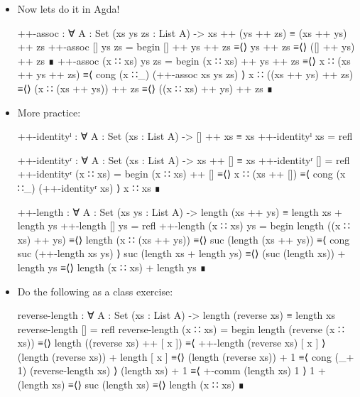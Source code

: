 \documentclass{lecturenotes}
\newcommand{\cons}{\ensuremath{\mathbin{\textsf{::}}}}
\newcommand{\app}{\ensuremath{\mathbin{\textsf{++}}}}
\begin{document}
\begin{itemize}
\begin{proof}
    \noindent\textbf{Base case ($xs = x \cons xs'$):}
    $$
    \begin{array}{l@{=\langle}c@{\rangle}}
      (x \cons xs') \app (ys \app zs) & \text{computation}\\
      x \cons (xs' \app (ys \app zs)) & \text{IH}\\
      x \cons ((xs' \app ys) \app zs) & \text{computation}\\
      (x \cons (xs' \app ys)) \app zs & \text{computation}\\
      \multicolumn{2}{l}{((x \cons xs') \app ys) \app zs}
    \end{array}
    $$
  \end{proof}
\pagebreak
\item Now lets do it in Agda!
\begin{code}
++-assoc : ∀ {A : Set} (xs ys zs : List A) -> xs ++ (ys ++ zs) ≡ (xs ++ ys) ++ zs
++-assoc [] ys zs =
  begin
    [] ++ ys ++ zs
  ≡⟨⟩
    ys ++ zs
  ≡⟨⟩
    ([] ++ ys) ++ zs
  ∎
++-assoc (x ∷ xs) ys zs =
  begin
    (x ∷ xs) ++ ys ++ zs
  ≡⟨⟩
    x ∷ (xs ++ ys ++ zs)
  ≡⟨ cong (x ∷_) (++-assoc xs ys zs) ⟩
    x ∷ ((xs ++ ys) ++ zs)
  ≡⟨⟩
    (x ∷ (xs ++ ys)) ++ zs
  ≡⟨⟩
    ((x ∷ xs) ++ ys) ++ zs
  ∎
\end{code}
\item More practice:
\begin{code}
++-identityˡ : ∀ {A : Set} (xs : List A) -> [] ++ xs ≡ xs
++-identityˡ xs = refl

++-identityʳ : ∀ {A : Set} (xs : List A) -> xs ++ [] ≡ xs
++-identityʳ [] = refl
++-identityʳ (x ∷ xs) =
  begin
     (x ∷ xs) ++ []
  ≡⟨⟩
    x ∷ (xs ++ [])
  ≡⟨ cong (x ∷_) (++-identityʳ xs) ⟩
    x ∷ xs
  ∎

++-length : ∀ {A : Set} (xs ys : List A) -> length (xs ++ ys) ≡ length xs + length ys
++-length [] ys = refl
++-length (x ∷ xs) ys =
  begin
    length ((x ∷ xs) ++ ys)
  ≡⟨⟩
    length (x ∷ (xs ++ ys))
  ≡⟨⟩
    suc (length (xs ++ ys))
  ≡⟨ cong suc (++-length xs ys) ⟩
    suc (length xs + length ys)
  ≡⟨⟩
    (suc (length xs)) + length ys
  ≡⟨⟩
    length (x ∷ xs) + length ys
  ∎
\end{code}
\item Do the following as a class exercise:
\begin{code}
reverse-length : ∀ {A : Set} (xs : List A) -> length (reverse xs) ≡ length xs
reverse-length [] = refl
reverse-length (x ∷ xs) =
  begin
    length (reverse (x ∷ xs))
  ≡⟨⟩
    length ((reverse xs) ++ [ x ])
  ≡⟨ ++-length (reverse xs) [ x ] ⟩
    (length (reverse xs)) + length [ x ]
  ≡⟨⟩
    (length (reverse xs)) + 1
  ≡⟨ cong (_+ 1) (reverse-length xs) ⟩
    (length xs) + 1
  ≡⟨ +-comm (length xs) 1 ⟩
    1 + (length xs)
  ≡⟨⟩
    suc (length xs)
  ≡⟨⟩
    length (x ∷ xs)
  ∎
\end{code}


\end{itemize}
\end{document}
